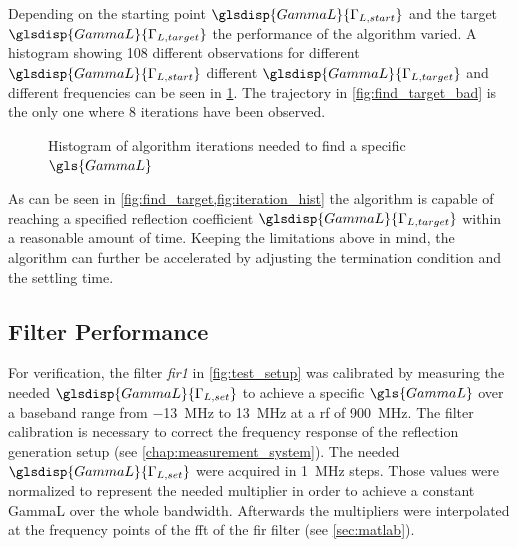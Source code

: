 \documentclass[12pt,a4paper,parskip=full,abstract=true,BCOR=12mm]{scrreprt}
\def\device#1{\mbox{\textit{#1}}}
\begin{document}
Depending on the starting point $\glsdisp{GammaL}{\Gamma_{L,start}}$ and the target $\glsdisp{GammaL}{\Gamma_{L,target}}$
the performance of the algorithm varied. A histogram showing 108 different
observations for different $\glsdisp{GammaL}{\Gamma_{L,start}}$ different $\glsdisp{GammaL}{\Gamma_{L,target}}$ and
different frequencies can be seen in \cref{fig:iteration_hist}. The trajectory
in \cref{fig:find_target_bad} is the only one where 8 iterations have been observed.

\begin{figure}[htb]
    \centering
    \caption{Histogram of algorithm iterations needed to find a specific $\gls{GammaL}$}
    \label{fig:iteration_hist}
\end{figure}

As can be seen in \cref{fig:find_target,fig:iteration_hist} the algorithm is capable
of reaching a specified reflection coefficient $\glsdisp{GammaL}{\Gamma_{L,target}}$ within a reasonable
amount of time. Keeping the limitations above in mind, the algorithm can further be
accelerated by adjusting the termination condition and the settling time.

\subsection{Filter Performance}
\label{sec:filter}

For verification, the filter \device{fir1} in \cref{fig:test_setup} was calibrated
by measuring the needed $\glsdisp{GammaL}{\Gamma_{L,set}}$ to achieve a specific $\gls{GammaL}$ over a
baseband range from \SI{-13}{\mega\hertz} to \SI{13}{\mega\hertz} at a \gls{rf} of
\SI{900}{\mega\hertz}. The filter calibration is necessary to correct
the frequency response of the reflection generation setup (see \cref{chap:measurement_system}). The needed
$\glsdisp{GammaL}{\Gamma_{L,set}}$ were acquired in \SI{1}{\mega\hertz} steps. Those
values were normalized to represent the needed multiplier in order
to achieve a constant \gls{GammaL} over the whole bandwidth. Afterwards the multipliers
were interpolated at the frequency points of the \gls{fft} of the \gls{fir} filter (see \cref{sec:matlab}).
\end{document}
